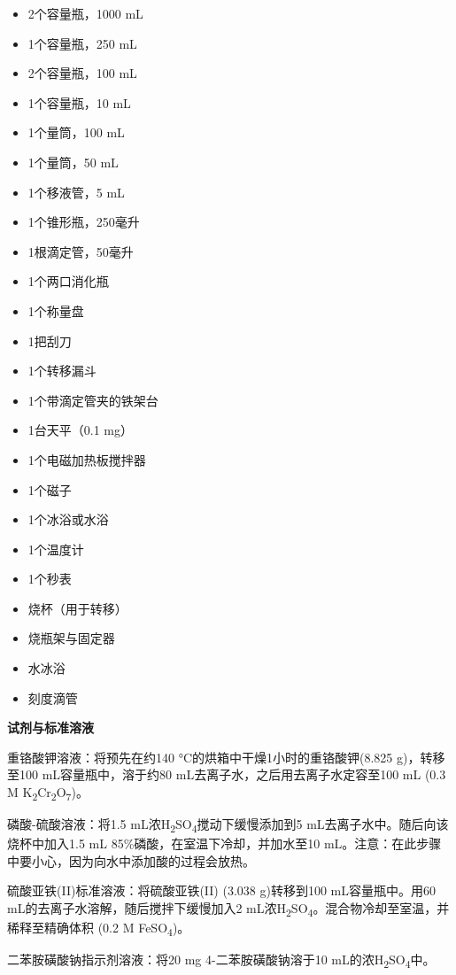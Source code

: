\begin{itemize}
\tightlist
\item
  2个容量瓶，1000 mL
\item
  1个容量瓶，250 mL
\item
  2个容量瓶，100 mL
\item
  1个容量瓶，10 mL
\item
  1个量筒，100 mL
\item
  1个量筒，50 mL
\item
  1个移液管，5 mL
\item
  1个锥形瓶，250毫升
\item
  1根滴定管，50毫升
\item
  1个两口消化瓶
\item
  1个称量盘
\item
  1把刮刀
\item
  1个转移漏斗
\item
  1个带滴定管夹的铁架台
\item
  1台天平（0.1 mg）
\item
  1个电磁加热板搅拌器
\item
  1个磁子
\item
  1个冰浴或水浴
\item
  1个温度计
\item
  1个秒表
\item
  烧杯（用于转移）
\item
  烧瓶架与固定器
\item
  水冰浴
\item
  刻度滴管
\end{itemize}

\textbf{试剂与标准溶液}

重铬酸钾溶液：将预先在约140 °C的烘箱中干燥1小时的重铬酸钾(8.825
g)，转移至100 mL容量瓶中，溶于约80 mL去离子水，之后用去离子水定容至100
mL (0.3 M K\textsubscript{2}Cr\textsubscript{2}O\textsubscript{7})。

磷酸-硫酸溶液：将1.5
mL浓H\textsubscript{2}SO\textsubscript{4}搅动下缓慢添加到5
mL去离子水中。随后向该烧杯中加入1.5 mL
85\%磷酸，在室温下冷却，并加水至10
mL。注意：在此步骤中要小心，因为向水中添加酸的过程会放热。

硫酸亚铁(II)标准溶液：将硫酸亚铁(II) (3.038 g)转移到100 mL容量瓶中。用60
mL的去离子水溶解，随后搅拌下缓慢加入2
mL浓H\textsubscript{2}SO\textsubscript{4}。混合物冷却至室温，并稀释至精确体积
(0.2 M FeSO\textsubscript{4})。

二苯胺磺酸钠指示剂溶液：将20 mg 4-二苯胺磺酸钠溶于10
mL的浓H\textsubscript{2}SO\textsubscript{4}中。

